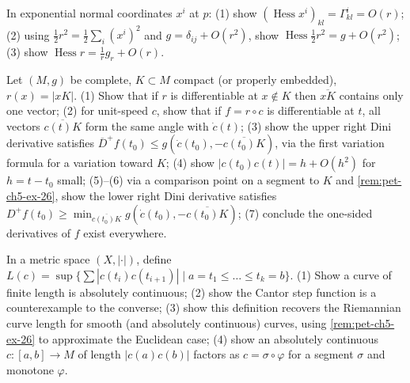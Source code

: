 \begin{remark}
  \label{rem:pet-ch5-ex-27}
  In exponential normal coordinates $x^i$ at $p$: (1) show
  $(\operatorname{Hess}x^i)_{kl}=\Gamma^i_{kl}=O(r)$; (2) using
  $\tfrac12r^2=\tfrac12\sum_i(x^i)^2$ and $g=\delta_{ij}+O(r^2)$, show
  $\operatorname{Hess}\tfrac12r^2=g+O(r^2)$; (3) show $\operatorname{Hess}r=
  \tfrac1rg_r+O(r)$.
\end{remark}

\begin{remark}
  \label{rem:pet-ch5-ex-28}
  Let $(M,g)$ be complete, $K\subset M$ compact (or properly embedded), $r(x)=|xK|$.
  (1) Show that if $r$ is differentiable at $x\notin K$ then $\overline{xK}$
  contains only one vector; (2) for unit-speed $c$, show that if $f=r\circ c$ is
  differentiable at $t$, all vectors $\overline{c(t)K}$ form the same angle with
  $\dot c(t)$; (3) show the upper right Dini derivative satisfies
  $\overline D^+f(t_0)\le g(\dot c(t_0),-\overline{c(t_0)K})$, via the first
  variation formula for a variation toward $K$; (4) show
  $|c(t_0)c(t)|=h+O(h^2)$ for $h=t-t_0$ small; (5)–(6) via a comparison point on a
  segment to $K$ and \cref{rem:pet-ch5-ex-26}, show the lower right Dini derivative
  satisfies $D^+f(t_0)\ge\min_{\overline{c(t_0)K}}g(\dot c(t_0),-\overline{c(t_0)K})$;
  (7) conclude the one-sided derivatives of $f$ exist everywhere.
\end{remark}

\begin{remark}
  \label{rem:pet-ch5-ex-29}
  In a metric space $(X,|\cdot|)$, define
  $L(c)=\sup\{\sum|c(t_i)c(t_{i+1})|\mid a=t_1\le\dots\le t_k=b\}$. (1) Show a
  curve of finite length is absolutely continuous; (2) show the Cantor step
  function is a counterexample to the converse; (3) show this definition recovers
  the Riemannian curve length for smooth (and absolutely continuous) curves, using
  \cref{rem:pet-ch5-ex-26} to approximate the Euclidean case; (4) show an
  absolutely continuous $c:[a,b]\to M$ of length $|c(a)c(b)|$ factors as
  $c=\sigma\circ\varphi$ for a segment $\sigma$ and monotone $\varphi$.
\end{remark}

